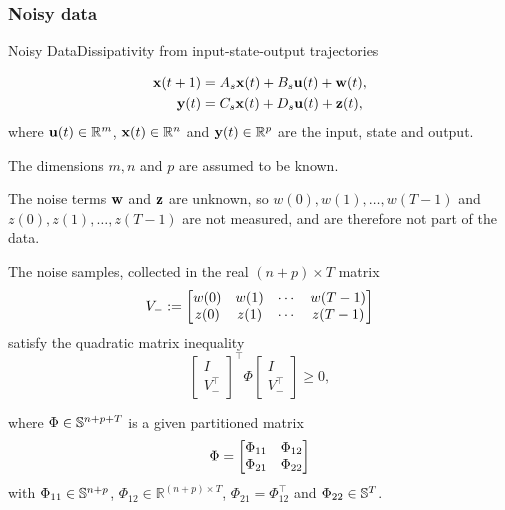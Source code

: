 \documentclass[aspectratio=169, handout, 10pt, hyperref=colorlinks]{beamer}
\begin{document}
\subsubsection{Noisy data}
\begin{frame}[allowframebreaks]{Noisy Data}{Dissipativity from input-state-output trajectories}
\begin{problem}
    \begin{equation}
        \begin{aligned}
        \bmx(t+1)&=A_{s} \bmx(t)+B_{s} \bmu(t)  + \bmw(t),\\
        \bmy(t)&=C_{s} \bmx(t)+D_{s} \bmu(t) + \bmz(t),  \end{aligned}
    \end{equation}
    where $\bmu(t) \in \mathbb{R}^m$, $\bmx(t) \in \mathbb{R}^n$ and $\bmy(t) \in\R^{p}$ are the input, state and output.

    The dimensions $m,n$ and $p$ are assumed to be known. 
    
    The noise terms $\bmw$ and $\bmz$ are unknown, so $w(0),w(1),\dots,w(T-1)$ and  $z(0),z(1),\dots,z(T-1)$ are not measured, and are therefore not part of the data. 
\end{problem}
\begin{definition} \label{ch5:assumption on noise samples}
The noise samples,
collected in the real $(n + p) \times T$ matrix 
$$
V_- := \bbm w(0) & w(1) & \cdots & w(T-1) \\  z(0) & z(1)  & \cdots & z(T-1)    \ebm
$$
satisfy the quadratic matrix inequality
\begin{equation} 
    \label{ch5:asnoise}
    \begin{bmatrix}
    I \\ V_-^\top 
    \end{bmatrix}^\top 
    \Phi
    \begin{bmatrix}
    I \\ V_-^\top 
    \end{bmatrix} \geq 0,
\end{equation}
\end{definition}
\begin{definition}    
where $\Phi \in \S{n +p + T}$ is a given partitioned matrix 
\begin{equation} \label{ch5:eq:Phi}
\Phi = \bbm \Phi_{11}  & \Phi_{12} \\ \Phi_{21} & \Phi_{22} \ebm
\end{equation}
with $\Phi_{11} \in \S{n + p}$, $\Phi_{12} \in \mathbb{R}^{(n + p) \times T}$, $\Phi_{21} = \Phi_{12}^\top$ and $\Phi_{22} \in \S{T}$.


\end{definition}
\end{frame}
\end{document}

